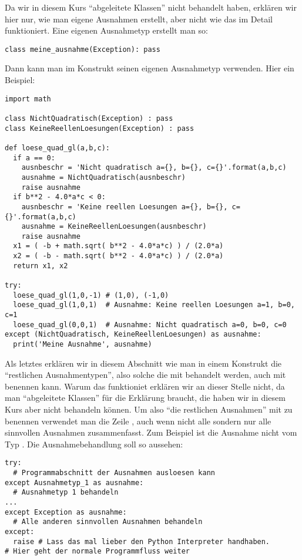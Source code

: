 Da wir in diesem Kurs  ``abgeleitete Klassen'' nicht behandelt haben, erklären wir hier nur, wie man eigene Ausnahmen erstellt, aber nicht wie das im Detail funktioniert.
Eine eigenen Ausnahmetyp erstellt man so:
\begin{lstlisting}
class meine_ausnahme(Exception): pass
\end{lstlisting}
Dann kann man im  Konstrukt seinen eigenen Ausnahmetyp verwenden.
Hier ein Beispiel:
\begin{lstlisting}
import math

class NichtQuadratisch(Exception) : pass
class KeineReellenLoesungen(Exception) : pass

def loese_quad_gl(a,b,c):
  if a == 0:
    ausnbeschr = 'Nicht quadratisch a={}, b={}, c={}'.format(a,b,c)
    ausnahme = NichtQuadratisch(ausnbeschr)
    raise ausnahme
  if b**2 - 4.0*a*c < 0:
    ausnbeschr = 'Keine reellen Loesungen a={}, b={}, c={}'.format(a,b,c)
    ausnahme = KeineReellenLoesungen(ausnbeschr)
    raise ausnahme
  x1 = ( -b + math.sqrt( b**2 - 4.0*a*c) ) / (2.0*a)
  x2 = ( -b - math.sqrt( b**2 - 4.0*a*c) ) / (2.0*a)
  return x1, x2

try:
  loese_quad_gl(1,0,-1) # (1,0), (-1,0)
  loese_quad_gl(1,0,1)  # Ausnahme: Keine reellen Loesungen a=1, b=0, c=1
  loese_quad_gl(0,0,1)  # Ausnahme: Nicht quadratisch a=0, b=0, c=0
except (NichtQuadratisch, KeineReellenLoesungen) as ausnahme:
  print('Meine Ausnahme', ausnahme)
\end{lstlisting}

Als letztes erklären wir in diesem Abschnitt wie man in einem  Konstrukt die ``restlichen Ausnahmentypen'', also solche die mit  behandelt werden, auch mit  benennen kann.
Warum das funktioniet erklären wir an dieser Stelle nicht, da man ``abgeleitete Klassen'' für die Erklärung braucht, die haben wir in diesem Kurs aber nicht behandeln können.
Um also ``die restlichen Ausnahmen'' mit  zu benennen verwendet man die Zeile , auch wenn  nicht alle sondern nur alle sinnvollen Ausnahmen zusammenfasst.
Zum Beispiel ist die Ausnahme  nicht vom Typ .
Die Ausnahmebehandlung soll so aussehen:
\begin{lstlisting}
try:
  # Programmabschnitt der Ausnahmen ausloesen kann
except Ausnahmetyp_1 as ausnahme:
  # Ausnahmetyp 1 behandeln
...
except Exception as ausnahme:
  # Alle anderen sinnvollen Ausnahmen behandeln
except:
  raise # Lass das mal lieber den Python Interpreter handhaben.
# Hier geht der normale Programmfluss weiter
\end{lstlisting}
